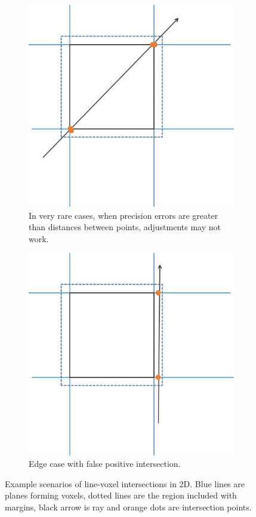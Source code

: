 \documentclass[12pt,a4paper]{article}
\begin{document}
\begin{figure}[p]
	\begin{subfigure}[t]{0.45\textwidth}
		\centering
		\includegraphics[width=0.8\linewidth]{ray_edge_case_1}
		\caption{In very rare cases, when precision errors are greater than distances between points, adjustments may not work.}
		\label{fig:ray_edge_case_1}
	\end{subfigure}
	\hfill
	\begin{subfigure}[t]{0.45\textwidth}
		\centering
		\includegraphics[width=0.8\linewidth]{ray_edge_case_2}
		\caption{Edge case with false positive intersection.}
		\label{fig:ray_edge_case_2}
	\end{subfigure}
	\medskip %

	\caption{Example scenarios of line-voxel intersections in 2D. Blue lines are planes forming voxels, dotted lines are the region included with margins, black arrow is ray and orange dots are intersection points.}
	\label{fig:ray_intersections}

\end{figure}
\end{document}
